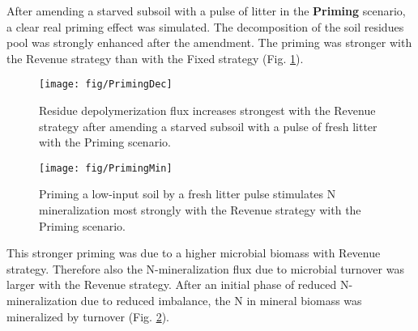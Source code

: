 After amending a starved subsoil with a pulse of litter in the
\textbf{Priming} scenario, a clear real priming effect was simulated. The
decomposition of the soil residues pool was strongly enhanced after the
amendment. The priming was stronger with the Revenue strategy than with the
Fixed strategy (Fig. \ref{fig:PrimingDec}). 

\begin{figure}[t]
\vspace*{2mm}
\begin{center}
\texttt{[image: fig/PrimingDec]}
\end{center}
\caption{Residue depolymerization flux increases strongest with the Revenue
strategy after amending a starved subsoil with a pulse of fresh litter with the
Priming scenario.
\label{fig:PrimingDec}}
\end{figure}

\begin{figure}[t]
\vspace*{2mm}
\begin{center}
\texttt{[image: fig/PrimingMin]}
\end{center}
\caption{Priming a low-input soil by a fresh litter pulse stimulates N
mineralization most strongly with the Revenue strategy with the Priming scenario.
\label{fig:PrimingMin}}
\end{figure}

This stronger priming was due to a higher microbial biomass with Revenue
strategy. Therefore also the N-mineralization flux due to microbial turnover
was larger with the Revenue strategy. After an initial phase of reduced
N-mineralization due to reduced imbalance, the N in mineral biomass was
mineralized by turnover (Fig. \ref{fig:PrimingMin}).

